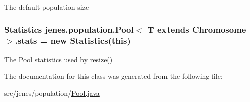 The default population size \hypertarget{classjenes_1_1population_1_1_pool_3_01_t_01extends_01_chromosome_01_4_a98d9a689a6c349c42a70afcd55a71e35}{
\subsubsection[{stats}]{\setlength{\rightskip}{0pt plus 5cm}Statistics jenes.\-population.\-Pool$<$ T extends Chromosome $>$.stats = new Statistics(this)\hspace{0.3cm}{\ttfamily [private]}}}\label{classjenes_1_1population_1_1_pool_3_01_t_01extends_01_chromosome_01_4_a98d9a689a6c349c42a70afcd55a71e35}
The Pool statistics used by \hyperlink{classjenes_1_1population_1_1_pool_3_01_t_01extends_01_chromosome_01_4_ac9cfd19d4ef83db5f3b1e805458714c2}{resize()} 

The documentation for this class was generated from the following file\-:\begin{DoxyCompactItemize}
\item 
src/jenes/population/\hyperlink{_pool_8java}{Pool.\-java}\end{DoxyCompactItemize}
